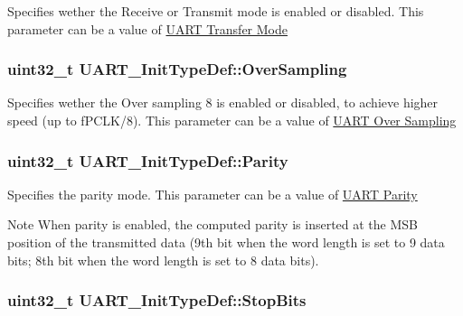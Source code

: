 Specifies wether the Receive or Transmit mode is enabled or disabled. This parameter can be a value of \hyperlink{group___u_a_r_t___mode}{U\-A\-R\-T Transfer Mode} \hypertarget{struct_u_a_r_t___init_type_def_a77c2c86a2186e09cbf022e27c0c82324}{
\subsubsection[{Over\-Sampling}]{\setlength{\rightskip}{0pt plus 5cm}uint32\-\_\-t U\-A\-R\-T\-\_\-\-Init\-Type\-Def\-::\-Over\-Sampling}}\label{struct_u_a_r_t___init_type_def_a77c2c86a2186e09cbf022e27c0c82324}
Specifies wether the Over sampling 8 is enabled or disabled, to achieve higher speed (up to f\-P\-C\-L\-K/8). This parameter can be a value of \hyperlink{group___u_a_r_t___over___sampling}{U\-A\-R\-T Over Sampling} \hypertarget{struct_u_a_r_t___init_type_def_adc92243425cb18cb8b5f03692841db48}{
\subsubsection[{Parity}]{\setlength{\rightskip}{0pt plus 5cm}uint32\-\_\-t U\-A\-R\-T\-\_\-\-Init\-Type\-Def\-::\-Parity}}\label{struct_u_a_r_t___init_type_def_adc92243425cb18cb8b5f03692841db48}
Specifies the parity mode. This parameter can be a value of \hyperlink{group___u_a_r_t___parity}{U\-A\-R\-T Parity} \begin{DoxyNote}{Note}
When parity is enabled, the computed parity is inserted at the M\-S\-B position of the transmitted data (9th bit when the word length is set to 9 data bits; 8th bit when the word length is set to 8 data bits). 
\end{DoxyNote}
\hypertarget{struct_u_a_r_t___init_type_def_a6717dfe595617c7b2d57139d9cd306ef}{
\subsubsection[{Stop\-Bits}]{\setlength{\rightskip}{0pt plus 5cm}uint32\-\_\-t U\-A\-R\-T\-\_\-\-Init\-Type\-Def\-::\-Stop\-Bits}}\label{struct_u_a_r_t___init_type_def_a6717dfe595617c7b2d57139d9cd306ef}
